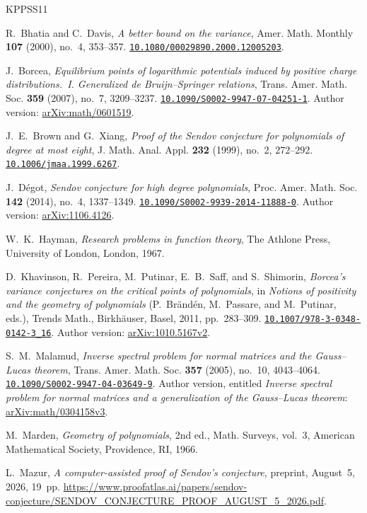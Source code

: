 \documentclass[11pt,reqno]{amsart}
\theoremstyle{definition}
\theoremstyle{remark}
\numberwithin{equation}{section}
\newcommand{\doi}[1]{\href{https://doi.org/#1}{\nolinkurl{#1}}}
\newcommand{\arxiv}[1]{\href{https://arxiv.org/abs/#1}{arXiv:#1}}
\begin{document}
\begin{thebibliography}{KPPSS11}

R.~Bhatia and C.~Davis, \emph{A better bound on the variance}, Amer. Math. Monthly \textbf{107} (2000), no.~4, 353--357. \doi{10.1080/00029890.2000.12005203}.

J.~Borcea, \emph{Equilibrium points of logarithmic potentials induced by positive charge distributions.~I. Generalized de Bruijn--Springer relations}, Trans. Amer. Math. Soc. \textbf{359} (2007), no.~7, 3209--3237. \doi{10.1090/S0002-9947-07-04251-1}. Author version: \arxiv{math/0601519}.

J.~E.~Brown and G.~Xiang, \emph{Proof of the Sendov conjecture for polynomials of degree at most eight}, J. Math. Anal. Appl. \textbf{232} (1999), no.~2, 272--292. \doi{10.1006/jmaa.1999.6267}.

J.~D\'egot, \emph{Sendov conjecture for high degree polynomials}, Proc. Amer. Math. Soc. \textbf{142} (2014), no.~4, 1337--1349. \doi{10.1090/S0002-9939-2014-11888-0}. Author version: \arxiv{1106.4126}.

W.~K.~Hayman, \emph{Research problems in function theory}, The Athlone Press, University of London, London, 1967.

D.~Khavinson, R.~Pereira, M.~Putinar, E.~B.~Saff, and S.~Shimorin, \emph{Borcea's variance conjectures on the critical points of polynomials}, in \emph{Notions of positivity and the geometry of polynomials} (P.~Br\"and\'en, M.~Passare, and M.~Putinar, eds.), Trends Math., Birkh\"auser, Basel, 2011, pp.~283--309. \doi{10.1007/978-3-0348-0142-3_16}. Author version: \arxiv{1010.5167v2}.

S.~M.~Malamud, \emph{Inverse spectral problem for normal matrices and the Gauss--Lucas theorem}, Trans. Amer. Math. Soc. \textbf{357} (2005), no.~10, 4043--4064. \doi{10.1090/S0002-9947-04-03649-9}. Author version, entitled \emph{Inverse spectral problem for normal matrices and a generalization of the Gauss--Lucas theorem}: \arxiv{math/0304158v3}.

M.~Marden, \emph{Geometry of polynomials}, 2nd ed., Math. Surveys, vol.~3, American Mathematical Society, Providence, RI, 1966.

L.~Mazur, \emph{A computer-assisted proof of Sendov's conjecture}, preprint, August~5, 2026, 19~pp. \url{https://www.proofatlas.ai/papers/sendov-conjecture/SENDOV_CONJECTURE_PROOF_AUGUST_5_2026.pdf}.


\end{thebibliography}
\end{document}
